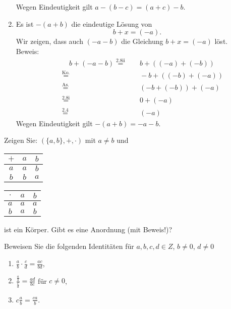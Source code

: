 \begin{lsg}
\begin{enumerate}[label=$\mathrm{(\roman*)}$, ref=$\mathrm{\roman*}$]
	Wegen Eindeutigkeit gilt $a-(b-c)=(a+c)-b$.
\item
    Es ist $-(a+b)$ die eindeutige L\"osung von
	\[b+x=(-a).\]
	Wir zeigen, dass auch $ (-a-b) $ die Gleichung $b+x=(-a)$ l\"ost.\\
	Beweis:
	\begin{align*}
		&&\quad b+(-a-b)\overset{\text{2.8ii}}{=} & \quad b+((-a)+(-b))\\
		&&\overset{\text{Ko.}}{=} & \quad -b+((-b)+(-a))\\
		&&\overset{\text{As.}}{=} & \quad (-b+(-b))+(-a)\\
		&&\overset{\text{2.8i}}{=} & \quad 0+(-a)\\
		&&\overset{\text{2.4}}{=} & \quad (-a)
		\end{align*}
	Wegen Eindeutigkeit gilt $-(a+b)=-a-b$.
\end{enumerate}
\end{lsg}

\bigskip

\begin{aufg}[6 Punkte]
Zeigen Sie: $\left( \{a,b\}, + , \cdot \right)$ mit $a\not=b$ und 
\begin{center}
\begin{tabular}{c|cc}
 $+$ & $a$ & $b$
 \\ \hline
 $a$ & $a$ & $b$
 \\
 $b$ & $b$ & $a$
\end{tabular}
\qquad
\begin{tabular}{c|cc}
 $\cdot$ & $a$ & $b$
 \\ \hline
 $a$ & $a$ & $a$
 \\
 $b$ & $a$ & $b$
\end{tabular}
\end{center}
ist ein K\"orper. Gibt es eine Anordnung (mit Beweis!)?
\end{aufg}
 
\bigskip

\begin{lsg}
\end{lsg}

\bigskip


\begin{aufg}[6 Punkte]
Beweisen Sie die folgenden Identit\"aten f\"ur $a,b,c,d \in Z$, $b\neq 0$, $d\neq 0$ 
\begin{enumerate}[label=$\mathrm{(\roman*)}$, ref=$\mathrm{\roman*}$]
\item $\frac{a}{b} \cdot \frac{c}{d} = \frac{ac}{bd}$, 
\item $\frac{\frac{a}{b}}{\frac{c}{d}} = \frac{ad}{bc}$ f\"ur $c\not=0$,
\item $c \frac{a}{b} = \frac{ca}{b}$.
\end{enumerate}
\end{aufg}

